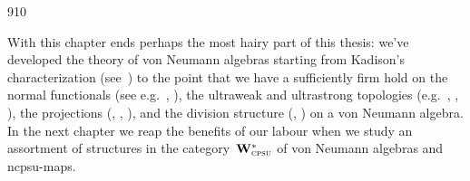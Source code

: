 \begin{parsec}{910}
\begin{point}{10}
With this chapter
ends perhaps the most hairy part of this thesis:
we've developed the theory of von Neumann algebras
starting from Kadison's characterization (see~)
to the point that we have a sufficiently firm hold on the normal functionals
(see e.g.~, ),
the ultraweak and ultrastrong topologies 
(e.g.~, , 
	),
the projections (, , 
), 
and the division structure 
(, )
on a von Neumann algebra.
In the next chapter we reap the benefits of our labour
when we study an assortment of structures
in the category~$\mathbf{W}^*_{\text{\textsc{cpsu}}}$ of von Neumann algebras
and ncpsu-maps.
\end{point}
\end{parsec}


